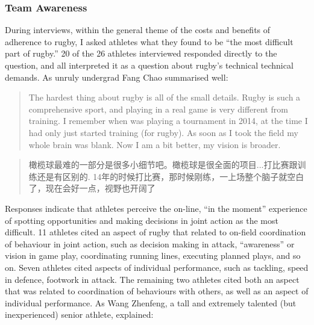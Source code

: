 \begin{CJK}{UTF8}{gbsn}

\subsubsection{Team Awareness}
During interviews, within the general theme of the costs and benefits of adherence to rugby, I asked athletes what they found to be ``the most difficult part of rugby.''  20 of the 26 athletes interviewed responded directly to the question, and all interpreted it as a question about rugby's technical technical demands.  As unruly undergrad Fang Chao summarised well:

\begin{quotation}
  The hardest thing about rugby is all of the small details. Rugby is such a comprehensive sport, and playing in a real game is very different from training. I remember when was playing a tournament in 2014, at the time I had only just started training (for rugby).  As soon as I took the field my whole brain was blank.  Now I am a bit better, my vision is broader.
\end{quotation}

\begin{quotation}
  橄榄球最难的一部分是很多小细节吧。橄榄球是很全面的项目...打比赛跟训练还是有区别的. 14年的时候打比赛，那时候刚练，一上场整个脑子就空白了，现在会好一点，视野也开阔了
\end{quotation}

Responses indicate that athletes perceive the on-line, ``in the moment'' experience of spotting opportunities and making decisions in joint action as the most difficult. 11 athletes cited an aspect of rugby that related to on-field coordination of behaviour in joint action, such as decision making in attack, ``awareness'' or vision in game play, coordinating running lines, executing planned plays, and so on.  Seven athletes cited aspects of individual performance, such as tackling, speed in defence, footwork in attack. The remaining two athletes cited both an aspect that was related to coordination of behaviours with others, as well as an aspect of individual performance.
As Wang Zhenfeng, a tall and extremely talented (but inexperienced) senior athlete, explained:


\end{CJK}
